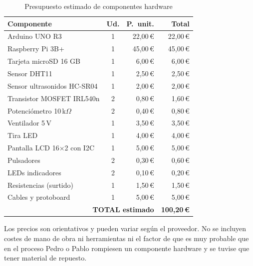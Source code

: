 \documentclass[12pt, a4paper]{article}
\begin{document}
\begin{table}[H]
    \centering
    \caption{Presupuesto estimado de componentes hardware}
    \label{tab:presupuesto}
    \renewcommand{\arraystretch}{1.3}
    \begin{tabularx}{\textwidth}{X c r r}
        \toprule
        \textbf{Componente}           & \textbf{Ud.} & \textbf{P.\ unit.} & \textbf{Total} \\
        \midrule
        Arduino UNO R3                & 1  & 22,00\,€  & 22,00\,€ \\
        Raspberry Pi 3B+              & 1  & 45,00\,€  & 45,00\,€ \\
        Tarjeta microSD 16 GB         & 1  &  6,00\,€  &  6,00\,€ \\
        Sensor DHT11                  & 1  &  2,50\,€  &  2,50\,€ \\
        Sensor ultrasonidos HC-SR04   & 1  &  2,00\,€  &  2,00\,€ \\
        Transistor MOSFET IRL540n     & 2  &  0,80\,€  &  1,60\,€ \\
        Potenciómetro 10\,k$\Omega$   & 2  &  0,40\,€  &  0,80\,€ \\
        Ventilador 5\,V               & 1  &  3,50\,€  &  3,50\,€ \\
        Tira LED                      & 1  &  4,00\,€  &  4,00\,€ \\
        Pantalla LCD 16×2 con I2C     & 1  &  5,00\,€  &  5,00\,€ \\
        Pulsadores                    & 2  &  0,30\,€  &  0,60\,€ \\
        LEDs indicadores              & 2  &  0,10\,€  &  0,20\,€ \\
        Resistencias (surtido)        & 1  &  1,50\,€  &  1,50\,€ \\
        Cables y protoboard           & 1  &  5,00\,€  &  5,00\,€ \\
        \midrule
        \multicolumn{3}{r}{\textbf{TOTAL estimado}} & \textbf{100,20\,€} \\
        \bottomrule
    \end{tabularx}
\end{table}

\noindent Los precios son orientativos y pueden variar según el proveedor. No se
incluyen costes de mano de obra ni herramientas ni el factor de que es muy probable que en el proceso Pedro o Pablo rompiesen un componente hardware y se tuvise que tener material de repuesto. 

\newpage
\end{document}
